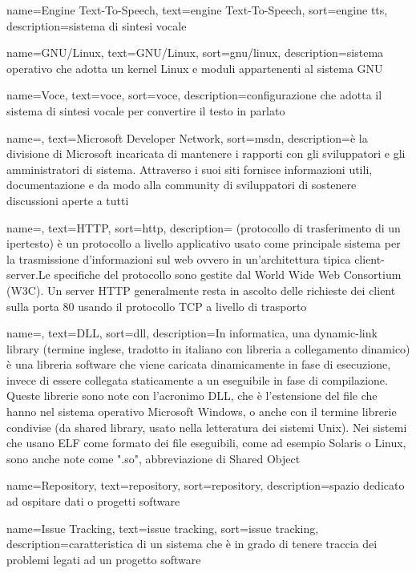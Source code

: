 {
	name=Engine Text-To-Speech,
	text=engine Text-To-Speech,
	sort=engine tts,
	description={sistema di sintesi vocale}
}

{
	name=GNU/Linux,
	text=GNU/Linux,
	sort=gnu/linux,
	description={sistema operativo che adotta un kernel Linux e moduli appartenenti al sistema GNU}
}

{
	name=Voce,
	text=voce,
	sort=voce,
	description={configurazione che adotta il sistema di sintesi vocale per convertire il testo in parlato}
}

{
	name=,
	text=Microsoft Developer Network,
	sort=msdn,
	description={è la divisione di Microsoft incaricata di mantenere i rapporti con gli sviluppatori e gli amministratori di sistema. Attraverso i suoi siti fornisce informazioni utili, documentazione e da modo alla community di sviluppatori di sostenere discussioni aperte a tutti}
}

{
	name=,
	text=HTTP,
	sort=http,
	description={ (protocollo di trasferimento di un ipertesto) è un protocollo a livello applicativo usato come principale sistema per la trasmissione d'informazioni sul web ovvero in un'architettura tipica client-server.Le specifiche del protocollo sono gestite dal World Wide Web Consortium (W3C). Un server HTTP generalmente resta in ascolto delle richieste dei client sulla porta 80 usando il protocollo TCP a livello di trasporto}
}

{
	name=,
	text=DLL,
	sort=dll,
	description={In informatica, una dynamic-link library (termine inglese, tradotto in italiano con libreria a collegamento dinamico) è una libreria software che viene caricata dinamicamente in fase di esecuzione, invece di essere collegata staticamente a un eseguibile in fase di compilazione. Queste librerie sono note con l'acronimo DLL, che è l'estensione del file che hanno nel sistema operativo Microsoft Windows, o anche con il termine librerie condivise (da shared library, usato nella letteratura dei sistemi Unix). Nei sistemi che usano ELF come formato dei file eseguibili, come ad esempio Solaris o Linux, sono anche note come ".so", abbreviazione di Shared Object}
}

{
	name=Repository,
	text=repository,
	sort=repository,
	description={spazio dedicato ad ospitare dati o progetti software}
}

{
	name=Issue Tracking,
	text=issue tracking,
	sort=issue tracking,
	description={caratteristica di un sistema che è in grado di tenere traccia dei problemi legati ad un progetto software}
}

